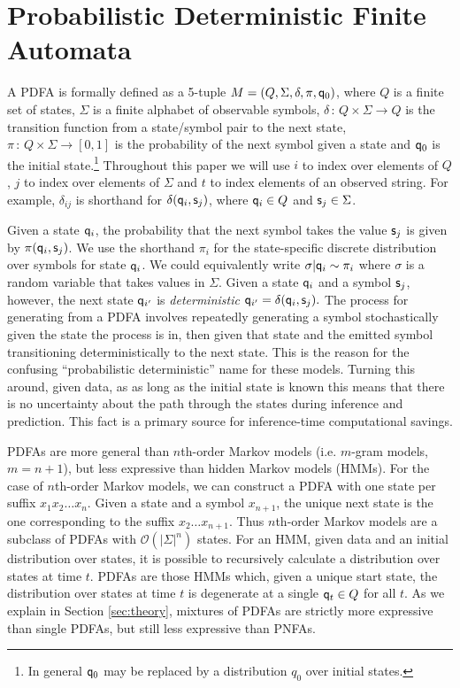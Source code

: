 \section{Probabilistic Deterministic Finite Automata}
\label{sec:PDFA}

A PDFA is formally defined as a 5-tuple $M = (Q,\Sigma,\delta,\pi,\state_0)$, where $Q$ is a finite set of states, $\Sigma$ is a finite alphabet of observable symbols, $\delta\,:\,Q\times\Sigma\rightarrow Q$ is the transition function from a state/symbol pair to the next state, $\pi\,:\,Q\times\Sigma\rightarrow[0,1]$ is the probability of the next symbol given a state and $\q_0$ is the initial state.\footnote{In general $\state_0$ may be replaced by a distribution $q_0$ over initial states.  }  Throughout this paper we will use $i$ to index over elements of $Q$, $j$ to index over elements of $\Sigma$ and $t$ to index elements of an observed string.  For example, $\delta_{ij}$ is shorthand for $\delta(\state_i,\symb_j)$, where $\state_i \in Q$ and $\symb_j \in \Sigma$.

Given a state $\state_i$, the probability that the next symbol takes the value $\symb_j$ is given by $\pi(\state_i,\symb_j)$.  We use the shorthand $\pi_i$ for the state-specific discrete distribution over symbols for state $\state_i$.  We could equivalently write $\sigma|\state_i \sim \pi_i$ where $\sigma$ is a random variable that takes values in $\Sigma$.  Given a state $\state_i$ and a symbol $\symb_j$, however, the next state $\state_{i'}$ is {\it deterministic} $\state_{i'} = \delta(\state_i,\symb_j).$   The process for generating from a PDFA involves repeatedly generating a symbol stochastically given the state the process is in, then given that state and the emitted symbol transitioning deterministically to the next state.  This is the reason for the confusing ``probabilistic deterministic'' name for these models.  Turning this around, given data, as as long as the initial state is known this means that there is no uncertainty about the path through the states during inference and prediction. 
This fact is a primary source for inference-time computational savings.

PDFAs are more general than $n$th-order Markov models (i.e. $m$-gram models, $m=n+1$), but less expressive than hidden Markov models (HMMs)\cite{Dupont2005}.  For the case of $n$th-order Markov models, we can construct a PDFA with one state per suffix $x_1 x_2 \ldots x_n$.  Given a state and a symbol $x_{n+1}$, the unique next state is the one corresponding to the suffix $x_2 \ldots x_{n+1}$.  Thus $n$th-order Markov models are a subclass of PDFAs with $\mathcal{O}(|\Sigma|^n)$ states.  For an HMM, given data and an initial distribution over states, it is possible to recursively calculate a distribution over states at time $t$.  PDFAs are those HMMs which, given a unique start state, the distribution over states at time $t$ is degenerate at a single $\q_t \in Q$ for all $t$.  As we explain in Section \ref{sec:theory}, mixtures of PDFAs are strictly more expressive than single PDFAs, but still less expressive than PNFAs.
